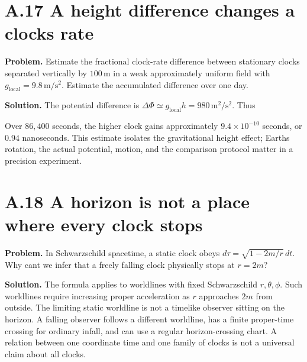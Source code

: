 \documentclass[
  11pt,
  letterpaper,
  oneside,
  openany]{scrbook}
\begin{document}
\hypertarget{a.17-a-height-difference-changes-a-clocks-rate}{%
\section{A.17 A height difference changes a clock\textquotesingle s
rate}\label{a.17-a-height-difference-changes-a-clocks-rate}}

\textbf{Problem.} Estimate the fractional clock-rate difference between
stationary clocks separated vertically by \(100\,\mathrm m\) in a weak
approximately uniform field with
\(g_{\mathrm{local}}=9.8\,\mathrm{m/s^2}\). Estimate the accumulated
difference over one day.

\textbf{Solution.} The potential difference is
\(\Delta\Phi\simeq g_{\mathrm{local}}h=980\,\mathrm{m^2/s^2}\). Thus

\begin{center}
\begingroup
{}
\ifdim\wd\grmathbox>\linewidth
\resizebox{\linewidth}{!}{\usebox{\grmathbox}}
\else\usebox{\grmathbox}\fi
\endgroup
\end{center}

Over \(86{,}400\) seconds, the higher clock gains approximately
\(9.4\times10^{-10}\) seconds, or \(0.94\) nanoseconds. This estimate
isolates the gravitational height effect; Earth\textquotesingle s
rotation, the actual potential, motion, and the comparison protocol
matter in a precision experiment.

\hypertarget{a.18-a-horizon-is-not-a-place-where-every-clock-stops}{%
\section{A.18 A horizon is not a place where every clock
stops}\label{a.18-a-horizon-is-not-a-place-where-every-clock-stops}}

\textbf{Problem.} In Schwarzschild spacetime, a static clock obeys
\(d\tau=\sqrt{1-2m/r}\,dt\). Why can\textquotesingle t we infer that a
freely falling clock physically stops at \(r=2m\)?

\textbf{Solution.} The formula applies to worldlines with fixed
Schwarzschild \(r,\theta,\phi\). Such worldlines require increasing
proper acceleration as \(r\) approaches \(2m\) from outside. The
limiting static worldline is not a timelike observer sitting on the
horizon. A falling observer follows a different worldline, has a finite
proper-time crossing for ordinary infall, and can use a regular
horizon-crossing chart. A relation between one coordinate time and one
family of clocks is not a universal claim about all clocks.
\end{document}
